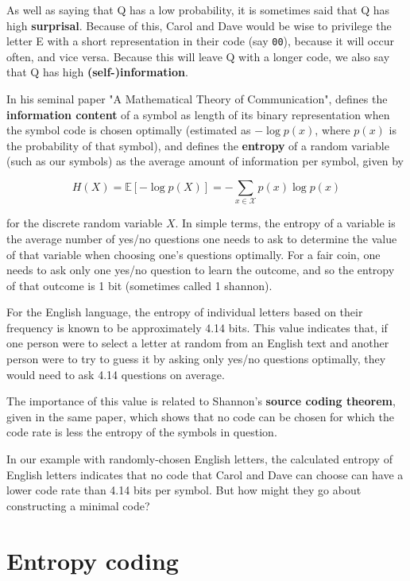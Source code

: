 As well as saying that Q has a low probability, it is sometimes said that Q has high \textbf{surprisal}. Because of this, Carol and Dave would be wise to privilege the letter E with a short representation in their code (say \texttt{00}), because it will occur often, and vice versa. Because this will leave Q with a longer code, we also say that Q has high \textbf{(self-)information}.

In his seminal paper "A Mathematical Theory of Communication", \textcite{shannon1948mathematical} defines the \textbf{information content} of a symbol as length of its binary representation when the symbol code is chosen optimally (estimated as $-\log p(x)$, where $p(x)$ is the probability of that symbol), and defines the \textbf{entropy} of a random variable (such as our symbols) as the average amount of information per symbol, given by

\[H(X) = \mathbb{E}[-\log p(X)] = -\sum_{x \in \mathcal{X}} p(x) \log p(x)\]

for the discrete random variable $X$. In simple terms, the entropy of a variable is the average number of yes/no questions one needs to ask to determine the value of that variable when choosing one's questions optimally. For a fair coin, one needs to ask only one yes/no question to learn the outcome, and so the entropy of that outcome is 1 bit (sometimes called 1 shannon).

For the English language, the entropy of individual letters based on their frequency is known to be approximately 4.14 bits. This value indicates that, if one person were to select a letter at random from an English text and another person were to try to guess it by asking only yes/no questions optimally, they would need to ask 4.14 questions on average.

The importance of this value is related to Shannon's \textbf{source coding theorem}, given in the same paper, which shows that no code can be chosen for which the code rate is less the entropy of the symbols in question.

In our example with randomly-chosen English letters, the calculated entropy of English letters indicates that no code that Carol and Dave can choose can have a lower code rate than 4.14 bits per symbol. But how might they go about constructing a minimal code?

\section{Entropy coding}

